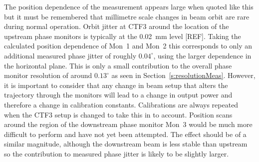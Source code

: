 The position dependence of the measurement appears large when quoted like this but it must be remembered that millimetre scale changes in beam orbit are rare during normal operation. Orbit jitter at CTF3 around the location of the upstream phase monitors is typically at the 0.02~mm level [REF]. Taking the calculated position dependence of Mon~1 and Mon~2 this corresponds to only an additional measured phase jitter of roughly \(0.04^\circ\), using the larger dependence in the horizontal plane. This is only a small contribution to the overall phase monitor resolution of around \(0.13^\circ\) as seen in Section~\ref{s:resolutionMeas}. However, it is important to consider that any change in beam setup that alters the trajectory through the monitors will lead to a change in output power and therefore a change in calibration constants. Calibrations are always repeated when the CTF3 setup is changed to take this in to account. Position scans around the region of the downstream phase monitor Mon~3 would be much more difficult to perform and have not yet been attempted. The effect should be of a similar magnitude, although the downstream beam is less stable than upstream so the contribution to measured phase jitter is likely to be slightly larger. 


